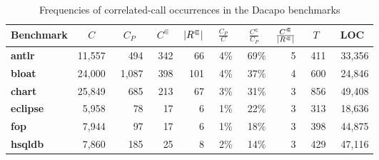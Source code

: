 \begin{table}
\caption{Frequencies of correlated-call occurrences in the Dacapo benchmarks}\label{tab:dacapostat}
\centering

\begin{tabular}{@{}lrrrrrrrrr@{}}
\toprule
\multicolumn{1}{l}{\textbf{Benchmark}} & \multicolumn{1}{c}{$C$} & \multicolumn{1}{c}{$C_P$} & \multicolumn{1}{c}{$C^\Subset$} & \multicolumn{1}{c}{$|{R^\Subset}|$} & \multicolumn{1}{c}{$\frac{C_P}{C}$} & \multicolumn{1}{c}{$\frac{C^\Subset}{C_P}$} & \multicolumn{1}{c}{$\frac{C^\Subset}{|{R^\Subset}|}$} & \multicolumn{1}{c}{$T$} & \multicolumn{1}{c}{LOC}    \\ \midrule
\textbf{antlr}                         & 11,557                  & 494                       & \ 342                             & 66                           & \ 4\%                                 & \ 69\%                                        & 5                                              & \ 411   & \ 33,356 \\
\textbf{bloat}                         & 24,000                  & \ 1,087                     & 398                             & 101                          & 4\%                                 & 37\%                                        & 4                                              & 600   & 24,846 \\
\textbf{chart}                         & 25,849                  & 685                       & 213                             & 67                           & 3\%                                 & 31\%                                        & 3                                              & 856   & 49,408 \\
\textbf{eclipse}                       & 5,958                   & 78                        & 17                              & 6                            & 1\%                                 & 22\%                                        & 3                                              & 313   & 18,636 \\
\textbf{fop}                           & 7,944                   & 97                        & 17                              & 6                            & 1\%                                 & 18\%                                        & 3                                              & 398   & 44,875 \\
\textbf{hsqldb}                        & 7,860                   & 185                       & 25                              & 8                            & 2\%                                 & 14\%                                        & 3                                              & 429   & 47,116 \\

\end{tabular}
\end{table}
